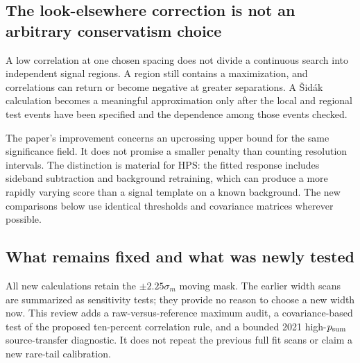 \subsection{The look-elsewhere correction is not an arbitrary conservatism choice}
A low correlation at one chosen spacing does not divide a continuous search into independent signal regions. A region still contains a maximization, and correlations can return or become negative at greater separations. A \v{S}id\'{a}k calculation becomes a meaningful approximation only after the local and regional test events have been specified and the dependence among those events checked.

The paper's improvement concerns an upcrossing upper bound for the same significance field\cite{AnanievRead}. It does not promise a smaller penalty than counting resolution intervals. The distinction is material for HPS: the fitted response includes sideband subtraction and background retraining, which can produce a more rapidly varying score than a signal template on a known background. The new comparisons below use identical thresholds and covariance matrices wherever possible.

\subsection{What remains fixed and what was newly tested}
All new calculations retain the $\pm2.25\sigma_m$ moving mask. The earlier width scans are summarized as sensitivity tests; they provide no reason to choose a new width now. This review adds a raw-versus-reference maximum audit, a covariance-based test of the proposed ten-percent correlation rule, and a bounded 2021 high-$p_{\rm sum}$ source-transfer diagnostic. It does not repeat the previous full fit scans or claim a new rare-tail calibration.
